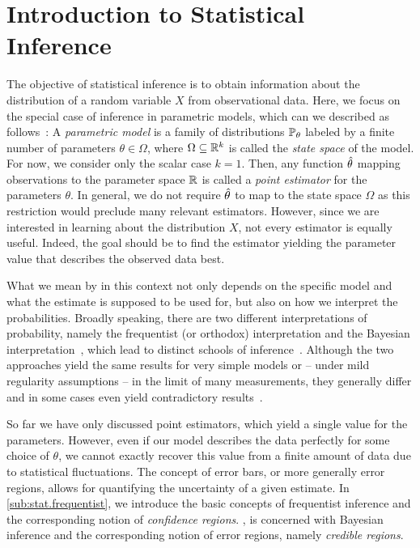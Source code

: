 \section{Introduction to Statistical Inference}
\label{sec:error.stat}

The objective of statistical inference is to obtain information about the distribution of a random variable $X$ from observational data.
Here, we focus on the special case of inference in parametric models, which can we described as follows~\cite{Wasserman_2013_All}:
A \emph{parametric model} is a family of distributions $\mathbb{P}_\theta$ labeled by a finite number of parameters $\theta \in \Omega$, where $\Omega \subseteq \mathbb{R}^k$ is called the \emph{state space} of the model.
For now, we consider only the scalar case $k=1$.
Then, any function $\hat{\theta}$ mapping observations to the parameter space $\mathbb{R}$ is called a \emph{point estimator} for the parameters $\theta$.
In general, we do not require $\hat{\theta}$ to map to the state space $\Omega$ as this restriction would preclude many relevant estimators.
However, since we are interested in learning about the distribution $X$, not every estimator is equally useful.
Indeed, the goal should be to find the estimator yielding the parameter value that describes the observed data best.

What we mean by  in this context not only depends on the specific model and what the estimate is supposed to be used for, but also on how we interpret the probabilities.
Broadly speaking, there are two different interpretations of probability, namely the frequentist (or orthodox) interpretation and the Bayesian interpretation~\cite{Hajek_2012_Interpretations,Caves_2000_Probabilities}, which lead to distinct schools of inference~\cite{Kiefer_2012_Introduction,Bolstad_2007_Introduction,Wasserman_2013_All}.
Although the two approaches yield the same results for very simple models or -- under mild regularity assumptions -- in the limit of many measurements, they generally differ and in some cases even yield contradictory results~\cite[Sec. 11.9]{Wasserman_2013_All}.

So far we have only discussed point estimators, which yield a single value for the parameters.
However, even if our model describes the data perfectly for some choice of $\theta$, we cannot exactly recover this value from a finite amount of data due to statistical fluctuations.
The concept of error bars, or more generally error regions, allows for quantifying the uncertainty of a given estimate.
In \cref{sub:stat.frequentist}, we introduce the basic concepts of frequentist inference and the corresponding notion of \emph{confidence regions}.
, is concerned with Bayesian inference and the corresponding notion of error regions, namely \emph{credible regions}.



